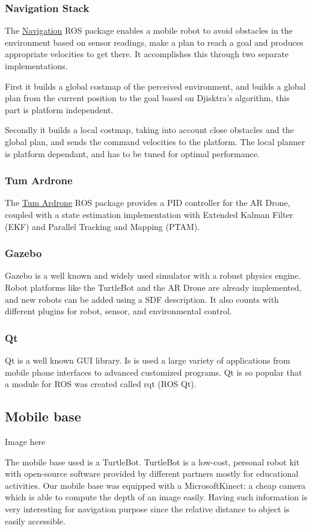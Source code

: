 \documentclass[11pt,a4paper]{article}
\begin{document}
\subsubsection{Navigation Stack}
The \href{http://wiki.ros.org/navigation}{Navigation} ROS package enables a mobile robot to avoid obstacles in the environment based on sensor readings, make a plan to reach a goal and produces appropriate velocities to get there. It accomplishes this through two separate implementations. 

First it builds a global costmap of the perceived environment, and builds a global plan from the current position to the goal based on Djisktra's algorithm, this part is platform independent. 

Secondly it builds a local costmap, taking into account close obstacles and the global plan, and sends the command velocities to the platform. The local planner is  platform dependant, and has to be tuned for optimal performance.

\subsubsection{Tum Ardrone}
The \href{http://wiki.ros.org/tum_ardrone}{Tum Ardrone} ROS package provides a PID controller for the AR Drone, coupled with a state estimation implementation with Extended Kalman Filter (EKF) and Parallel Tracking and Mapping (PTAM).

\subsubsection{Gazebo}
Gazebo is a well known and widely used simulator with a robust physics engine. 
Robot platforms like the TurtleBot and the AR Drone are already implemented, and new robots can be added using a SDF description. It also counts with different plugins  for robot, sensor, and environmental control. 

\subsubsection{Qt}
Qt is a well known GUI library. Is is used a large variety of applications from mobile phone interfaces to advanced customized programs. Qt is so popular that a module for ROS was
created called rqt (ROS Qt).


\subsection{Mobile base}
\begin{center}
Image here
\end{center}
The mobile base used is a TurtleBot. TurtleBot is a low-cost, personal robot kit with open-source software
provided by different partners mostly for educational activities.
Our mobile base was equipped with a Microsoft\textcopyright Kinect\texttrademark : a cheap camera which is
able to compute the depth of an image easily. Having such information is very interesting for navigation
purpose since the relative distance to object is easily accessible.
\end{document}
